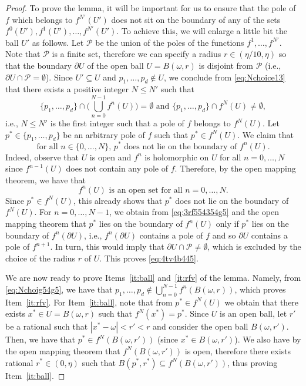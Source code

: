 \documentclass[11pt]{article}
\newcommand{\fn}[2]{#1^{#2}}
\begin{document}
\begin{proof}
To prove the lemma, it will be important for us to ensure that the pole of $f$ which belongs to $\fn{f}{N'}(U')$ does not sit on the boundary of any of the sets $\fn{f}{0}(U'),\fn{f}{1}(U'),\hdots,\fn{f}{N'}(U')$. To achieve this, we will enlarge a little bit the ball $U'$ as follows. Let $\mathcal{P}$ be the union of the poles of the functions $\fn{f}{1},\hdots,\fn{f}{N'}$. Note that $\mathcal{P}$ is a finite set, therefore we can specify a radius $r\in(\eta/10,\eta)$ so that the boundary $\partial U$ of the open ball $U=B(\omega,r)$ is disjoint from $\mathcal{P}$ (i.e., $\partial U\cap \mathcal{P}=\emptyset$). Since $U'\subseteq U$ and $p_1,\hdots,p_d\not\in U$, we conclude from \eqref{eq:Nchoice13} that there exists a positive integer $N\leq N'$ such that 
\begin{equation}\label{eq:Nchoig54g5}
\{p_1,\hdots,p_d\}\cap \Big(\bigcup^{N-1}_{n=0}\fn{f}{n}(U)\Big)=\emptyset\mbox{ and } \{p_1,\hdots,p_d\}\cap \fn{f}{N}(U)\neq \emptyset,
\end{equation}
i.e., $N\leq N'$ is the first integer such that a pole of $f$ belongs to $\fn{f}{N}(U)$. Let $p^*\in \{p_1,\hdots,p_d\}$ be an  arbitrary pole of $f$ such that $p^*\in \fn{f}{N}(U)$. We claim that 
\begin{equation}\label{eq:4tv4b445}
\mbox{for all $n\in \{0,\hdots, N\}$, $p^*$ does not lie on the boundary of $\fn{f}{n}(U)$.}
\end{equation} 
Indeed, observe that $U$ is open and $\fn{f}{n}$ is holomorphic on $U$ for all $n=0,\hdots, N$ since $\fn{f}{n-1}(U)$ does not contain any pole of $f$. Therefore, by the open mapping theorem, we have that 
\begin{equation}\label{eq:3rf554354g5}
\mbox{$\fn{f}{n}(U)$ is an open set  for all $n=0,\hdots,N$}.
\end{equation}
Since $p^*\in \fn{f}{N}(U)$, this already shows that $p^*$ does not lie on the boundary of $\fn{f}{N}(U)$. For $n=0,\hdots,N-1$, we obtain from \eqref{eq:3rf554354g5}  and the open mapping theorem that $p^*$ lies on the boundary of  $\fn{f}{n}(U)$ only if $p^*$ lies on the boundary of $\fn{f}{n}(\partial U)$, i.e., $\fn{f}{n}(\partial U)$ contains a pole of $f$ and so $\partial U$ contains a pole of $\fn{f}{n+1}$. 
In turn, this would imply that $\partial U\cap \mathcal{P}\neq \emptyset$, which is excluded by the choice of the radius $r$ of $U$. This proves \eqref{eq:4tv4b445}.


We are now ready to prove Items~\ref{it:ball} and~\ref{it:rfv} of the lemma. Namely, from \eqref{eq:Nchoig54g5}, we have that  $p_1,\hdots,p_d\notin \bigcup^{N-1}_{n=0}\fn{f}{n}(B(\omega,r))$, which proves Item~\ref{it:rfv}. For Item~\ref{it:ball}, note that from $p^*\in \fn{f}{N}(U)$ we obtain that there exists $x^*\in U=B(\omega,r)$ such that $\fn{f}{N}(x^*)=p^*$. Since $U$ is an open ball, let $r'$ be a rational such that $|x^*-\omega|<r'<r$ and consider the open ball $B(\omega,r')$. Then, we have that  $p^*\in \fn{f}{N}(B(\omega,r'))$ (since $x^*\in B(\omega,r')$). We also have by the open mapping theorem that $\fn{f}{N}(B(\omega,r'))$ is open, therefore there exists rational $r^*\in (0,\eta)$ such that $B(p^*,r^*)\subseteq \fn{f}{N}(B(\omega,r'))$, thus proving Item~\ref{it:ball}. 


\end{proof}
\end{document}
